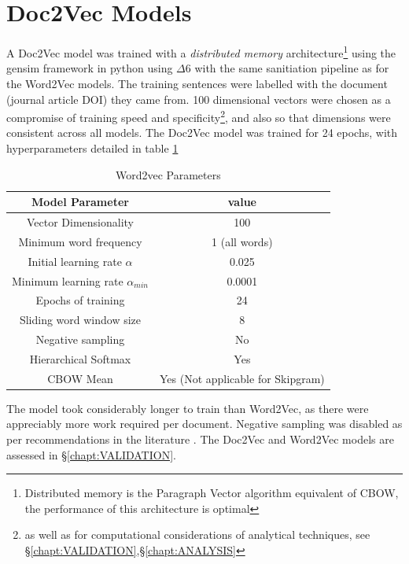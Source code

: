 \section{Doc2Vec Models}
A Doc2Vec model was trained with a \emph{distributed memory} architecture\footnote{Distributed memory is the Paragraph Vector algorithm equivalent of CBOW, the performance of this architecture is optimal\cite{doc2vec}} using the gensim framework in python \cite{gensim} using $\Delta6$ with the same sanitiation pipeline as for the Word2Vec models. The training sentences were labelled with the document (journal article DOI) they came from. 100 dimensional vectors were chosen as a compromise of training speed and specificity\footnote{as well as for computational considerations of analytical techniques, see \S\ref{chapt:VALIDATION},\S\ref{chapt:ANALYSIS}}, and also so that dimensions were consistent across all models. The Doc2Vec model was trained for 24 epochs, with hyperparameters detailed in table \ref{tab:doc2vechyperparams}
\begin{table}[H]
\begin{center}
\caption{Word2vec Parameters}
\label{tab:doc2vechyperparams}
\begin{tabular}{||c|c||}
\hline
Model Parameter & value\\
\hline
Vector Dimensionality & 100\\
Minimum word frequency & 1 (all words)\\
Initial learning rate $\alpha$ & 0.025 \\
Minimum learning rate $\alpha_{min}$&0.0001\\
Epochs of training & 24\\
Sliding word window size & 8\\
Negative sampling & No \\
Hierarchical Softmax & Yes\\
CBOW Mean & Yes (Not applicable for Skipgram) \\
\hline
\end{tabular}
\end{center}
\end{table}

The model took considerably longer to train than Word2Vec, as there were appreciably more work required per  document. Negative sampling was disabled as per recommendations in the literature\cite{gensim} \cite{doc2vec}.
The Doc2Vec and Word2Vec models are assessed in \S\ref{chapt:VALIDATION}.
